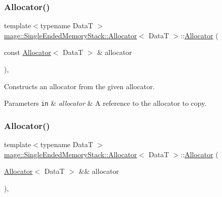 \subsubsection{\texorpdfstring{Allocator()}{Allocator()}\hspace{0.1cm}{\footnotesize\ttfamily [1/4]}}
{\footnotesize\ttfamily template$<$typename DataT $>$ \\
\hyperlink{classmage_1_1_single_ended_memory_stack_1_1_allocator}{mage\+::\+Single\+Ended\+Memory\+Stack\+::\+Allocator}$<$ DataT $>$\+::\hyperlink{classmage_1_1_single_ended_memory_stack_1_1_allocator}{Allocator} (\begin{DoxyParamCaption}\item[{const \hyperlink{classmage_1_1_single_ended_memory_stack_1_1_allocator}{Allocator}$<$ DataT $>$ \&}]{allocator }\end{DoxyParamCaption})\hspace{0.3cm}{\ttfamily [default]}, {\ttfamily [noexcept]}}

Constructs an allocator from the given allocator.


\begin{DoxyParams}[1]{Parameters}
\mbox{\tt in}  & {\em allocator} & A reference to the allocator to copy. \\
\hline
\end{DoxyParams}
\hypertarget{classmage_1_1_single_ended_memory_stack_1_1_allocator_a445eaee8e10d872886de2f4194ecca72}{}\label{classmage_1_1_single_ended_memory_stack_1_1_allocator_a445eaee8e10d872886de2f4194ecca72} 
\subsubsection{\texorpdfstring{Allocator()}{Allocator()}\hspace{0.1cm}{\footnotesize\ttfamily [2/4]}}
{\footnotesize\ttfamily template$<$typename DataT $>$ \\
\hyperlink{classmage_1_1_single_ended_memory_stack_1_1_allocator}{mage\+::\+Single\+Ended\+Memory\+Stack\+::\+Allocator}$<$ DataT $>$\+::\hyperlink{classmage_1_1_single_ended_memory_stack_1_1_allocator}{Allocator} (\begin{DoxyParamCaption}\item[{\hyperlink{classmage_1_1_single_ended_memory_stack_1_1_allocator}{Allocator}$<$ DataT $>$ \&\&}]{allocator }\end{DoxyParamCaption})\hspace{0.3cm}{\ttfamily [default]}, {\ttfamily [noexcept]}}

